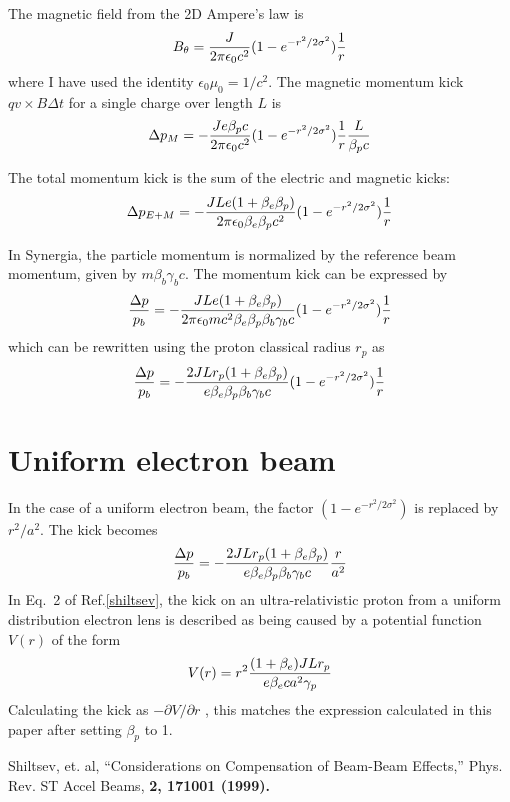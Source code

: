 \documentclass[acus]{jacow}
\begin{document}
The magnetic field from the 2D Ampere's law is
$$
B_\theta = {  J \over {2 \pi \epsilon_0 c^2}} ( 1 - e^{-{{r^2} / {2 \sigma^2}}} )  {1 \over r}
$$
where I have used the identity $\epsilon_0 \mu_0 = 1/c^2$.
The magnetic momentum kick $q v \times B \Delta t$ for a single charge over length $L$ is
$$
\Delta p_M = - {  J e \beta_p c \over {2 \pi \epsilon_0 c^2}} ( 1 - e^{-{{r^2} / {2 \sigma^2}}} )  {1 \over r}{ L \over { \beta_p c }}
$$

The total momentum kick is the sum of the electric and magnetic kicks:
$$
\Delta p_{E+M} = - {  J L e (1 + \beta_e \beta_p) \over {2 \pi \epsilon_0 \beta_e \beta_p c^2}} ( 1 - e^{-{{r^2} / {2 \sigma^2}}} ) {1 \over r}
$$

In Synergia, the particle momentum is normalized by the reference beam momentum, given by $m \beta_b \gamma_b c$.
The momentum kick can be expressed by
$$
{\Delta p \over p_b} = - {  J L e (1 + \beta_e \beta_p) \over {2 \pi \epsilon_0 m c^2 \beta_e \beta_p \beta_b \gamma_b c}} ( 1 - e^{-{{r^2} / {2 \sigma^2}}} ) {1 \over r}
$$
which can be rewritten using the proton classical radius $r_p$ as
$$
{\Delta p \over p_b} = - {  2 J L r_p (1 + \beta_e \beta_p) \over {e \beta_e \beta_p \beta_b \gamma_b c}} ( 1 - e^{-{{r^2} / {2 \sigma^2}}} ) {1 \over r}
$$

\section{Uniform electron beam}
In the case of a uniform electron beam, the factor $( 1 - e^{-{{r^2} / {2 \sigma^2}}} )$ is replaced by
$r^2/a^2$.
The kick becomes
$$
{\Delta p \over p_b} = - {  2 J L r_p (1 + \beta_e \beta_p) \over {e \beta_e \beta_p \beta_b \gamma_b c}} {r \over a^2}
$$
In Eq.~2 of Ref.\ref{shiltsev}, the kick on an ultra-relativistic proton from a
uniform distribution electron lens is described as being caused by a
potential function $V(r)$ of the form
$$
V(r) = r^2 {{(1 + \beta_e ) J L r_p } \over {e \beta_e c a^2 \gamma_p}}
$$
Calculating the kick as $ -\partial V / \partial r $ , this matches the  expression calculated
in this paper after
setting $\beta_p$ to 1.

\begin{thebibliography}{9}   %
  Shiltsev, et. al, ``Considerations on Compensation of Beam-Beam Effects,''
  Phys. Rev. ST Accel Beams, \bf{2}, 171001 (1999).
\end{thebibliography}
\end{document}
